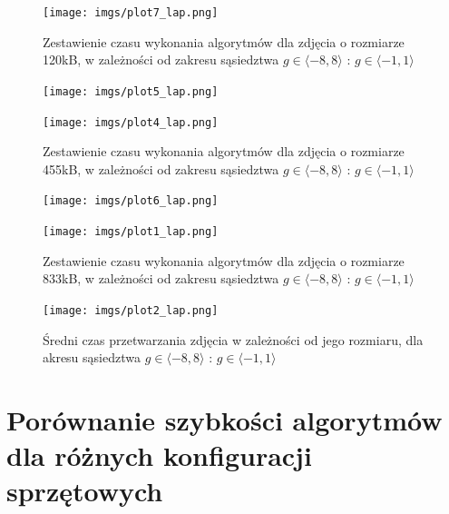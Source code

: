 \documentclass[document.tex]{subfiles}
\begin{document}
\begin{figure}[h]
\texttt{[image: imgs/plot7\_lap.png]}
\caption{Zestawienie czasu wykonania algorytmów dla zdjęcia o rozmiarze 120kB, 
        w zależności od zakresu sąsiedztwa $g\in \langle -8, 8 \rangle$ : $g\in \langle -1, 1 \rangle$ }
\label{fig:results_lap_hybrid}
\end{figure}

\begin{figure}[h]
\texttt{[image: imgs/plot5\_lap.png]}
\caption*{}
\label{fig:results_lap_hybrid}
\end{figure}

\begin{figure}[h]
\texttt{[image: imgs/plot4\_lap.png]}
\caption{Zestawienie czasu wykonania algorytmów dla zdjęcia o rozmiarze 455kB, 
        w zależności od zakresu sąsiedztwa $g\in \langle -8, 8 \rangle$ : $g\in \langle -1, 1 \rangle$ }
\label{fig:results_lap_hybrid}
\end{figure}

\begin{figure}[h]
\texttt{[image: imgs/plot6\_lap.png]}
\caption*{}
\label{fig:results_lap_hybrid}
\end{figure}

\begin{figure}[h]
\texttt{[image: imgs/plot1\_lap.png]}
\caption{Zestawienie czasu wykonania algorytmów dla zdjęcia o rozmiarze 833kB, 
        w zależności od zakresu sąsiedztwa $g\in \langle -8, 8 \rangle$ : $g\in \langle -1, 1 \rangle$ }
\label{fig:results_lap_hybrid}
\end{figure}

\begin{figure}[h]
\texttt{[image: imgs/plot2\_lap.png]}
\caption{Średni czas przetwarzania zdjęcia w zależności od jego rozmiaru, dla akresu sąsiedztwa $g\in \langle -8, 8 \rangle$ : $g\in \langle -1, 1 \rangle$}
\label{fig:results_lap_hybrid}
\end{figure}
\clearpage
\section{Porównanie szybkości algorytmów dla różnych konfiguracji sprzętowych}
\end{document}
